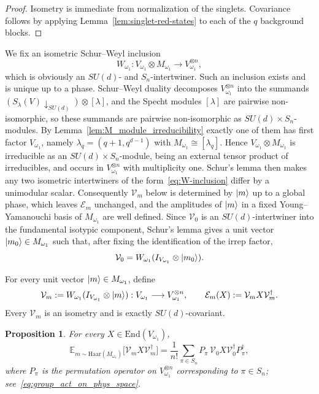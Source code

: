 \documentclass[11pt,letterpaper]{article}
\theoremstyle{plain}
\theoremstyle{plain}
\theoremstyle{plain}
\theoremstyle{plain}
\theoremstyle{plain}
\theoremstyle{plain}
\newcommand{\End}{\mathrm{End}}
\theoremstyle{plain}
\newtheorem{smproposition}[smtheorem]{Proposition}
\theoremstyle{definition}
\theoremstyle{plain}
\begin{document}
\begin{proof}
Isometry is immediate from normalization of the singlets.  
Covariance follows by applying Lemma~\ref{lem:singlet-red-states} to each of the $q$ background blocks.
\end{proof}
We fix an isometric Schur--Weyl inclusion
\begin{equation}
\label{eq:W-inclusion}
  W_{\omega_1}:V_{\omega_1}\otimes M_{\omega_1}\longrightarrow V_{\omega_1}^{\otimes n},
\end{equation}
which is obviously an $SU(d)$- and $S_n$-intertwiner.
Such an inclusion exists and is unique up to a phase. Schur--Weyl duality decomposes $V_{\omega_1}^{\otimes n}$ into the summands $\left(S_\lambda(V)\downarrow_{SU(d)}\right)\otimes[\lambda]$, 
and the Specht modules $[\lambda]$ are pairwise non-isomorphic, so these summands are pairwise non-isomorphic as $SU(d)\times S_n$-modules. 
By Lemma~\ref{lem:M_module_irreducibility} exactly one of them has first factor $V_{\omega_1}$, namely $\lambda_q=(q+1,q^{d-1})$ with $M_{\omega_1}\cong[\lambda_q]$. 
Hence $V_{\omega_1}\otimes M_{\omega_1}$ is irreducible as an $SU(d)\times S_n$-module, being an external tensor product of irreducibles, and occurs in $V_{\omega_1}^{\otimes n}$ with multiplicity one. 
Schur's lemma then makes any two isometric intertwiners of the form~\eqref{eq:W-inclusion} differ by a unimodular scalar. 
Consequently $\mathcal{V}_m$ below is determined by $\ket m$ up to a global phase, which leaves $\mathcal E_m$ unchanged, and the amplitudes of $\ket m$ in a fixed Young--Yamanouchi basis of $M_{\omega_1}$ are well defined.
Since $\mathcal{V}_0$ is an $SU(d)$-intertwiner into the fundamental isotypic component, Schur's lemma gives a unit vector $\ket{m_0}\in M_{\omega_1}$ such that, after fixing the identification of the irrep factor,
\begin{equation}
\label{eq:seed-multiplicity-vector}
  \mathcal{V}_0=W_{\omega_1}(I_{V_{\omega_1}}\otimes\ket{m_0}).
\end{equation}

For every unit vector $\ket m\in M_{\omega_1}$, define
\begin{equation}
\label{eq:Vm}
  \mathcal{V}_m:=W_{\omega_1}(I_{V_{\omega_1}}\otimes\ket m):V_{\omega_1}\longrightarrow V_{\omega_1}^{\otimes n},
  \qquad
  \mathcal{E}_m(X):=\mathcal{V}_mX\mathcal{V}_m^\dagger.
\end{equation}
Every $\mathcal{V}_m$ is an isometry and is exactly $SU(d)$-covariant.

\begin{smproposition}
\label{prop:orbit-twirl}
For every $X\in\End(V_{\omega_1})$,
\begin{equation}
\label{eq:orbit-twirl}
  \mathbb{E}_{m\sim\mathrm{Haar}(M_{\omega_1})}\bigl[\mathcal{V}_mX\mathcal{V}_m^\dagger\bigr]
  =\frac1{n!}\sum_{\pi\in S_n}
  P_\pi\,\mathcal{V}_0X\mathcal{V}_0^\dagger P_\pi^\dagger,
\end{equation}
where $P_\pi$ is the permutation operator on $V_{\omega_1}^{\otimes n}$ corresponding to $\pi\in S_n$; see~\eqref{eq:group_act_on_phys_space}.
\end{smproposition}
\end{document}
